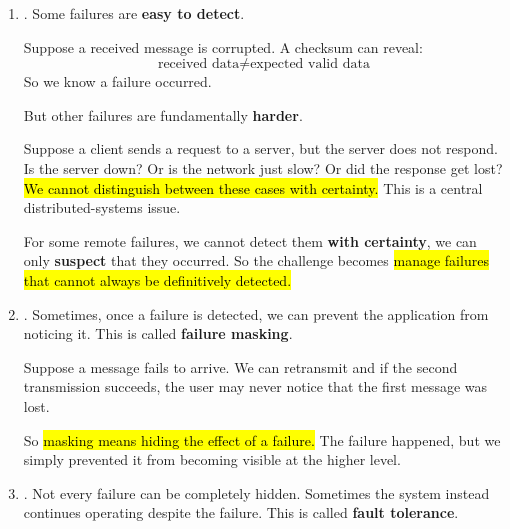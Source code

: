 \begin{enumerate}
    \item {}. Some failures are \textbf{easy to detect}.

        \begin{examplebox}
            Suppose a received message is corrupted. A checksum can reveal:
            \begin{equation*}
                \text{received data} \neq \text{expected valid data}
            \end{equation*}
            So we know a failure occurred.
        \end{examplebox}

        But other failures are fundamentally \textbf{harder}.

        \begin{examplebox}
            Suppose a client sends a request to a server, but the server does not respond. Is the server down? Or is the network just slow? Or did the response get lost? \hl{We cannot distinguish between these cases with certainty.} This is a central distributed-systems issue.
        \end{examplebox}

        For some remote failures, we cannot detect them \textbf{with certainty}, we can only \textbf{suspect} that they occurred. So the challenge becomes \hl{manage failures that cannot always be definitively detected.}

    \item {}. Sometimes, once a failure is detected, we can prevent the application from noticing it. This is called \textbf{failure masking}.

        \begin{examplebox}
            Suppose a message fails to arrive. We can retransmit and if the second transmission succeeds, the user may never notice that the first message was lost.
        \end{examplebox}

        So \hl{masking means hiding the effect of a failure.} The failure happened, but we simply prevented it from becoming visible at the higher level.

    \item {}. Not every failure can be completely hidden. Sometimes the system instead continues operating despite the failure. This is called \textbf{fault tolerance}.


\end{enumerate}
